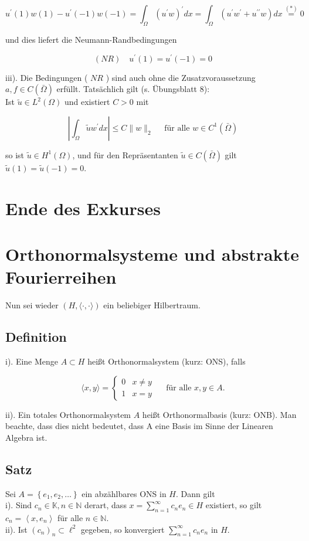 \documentclass[10pt, letterpaper]{article}
\begin{document}
$$
u^{\prime}(1) w(1)-u^{\prime}(-1) w(-1)=\int_{\Omega}\left(u^{\prime} w\right)^{\prime} d x=\int_{\Omega}\left(u^{\prime} w^{\prime}+u^{\prime \prime} w\right) d x \stackrel{(*)}{=} 0
$$

und dies liefert die Neumann-Randbedingungen

$$
(N R) \quad u^{\prime}(1)=u^{\prime}(-1)=0
$$

iii). Die Bedingungen ( $N R$ ) sind auch ohne die Zusatzvoraussetzung $a, f \in C(\bar{\Omega})$ erfüllt. Tatsächlich gilt (s. Übungsblatt 8):\\
Ist $\tilde{u} \in L^{2}(\Omega)$ und existiert $C>0$ mit

$$
\left|\int_{\Omega} \tilde{u} w^{\prime} d x\right| \leq C\|w\|_{2} \quad \text { für alle } w \in C^{1}(\bar{\Omega})
$$

so ist $\tilde{u} \in H^{1}(\Omega)$, und für den Repräsentanten $\tilde{u} \in C(\bar{\Omega})$ gilt $\tilde{u}(1)=\tilde{u}(-1)=0$.

\section*{Ende des Exkurses}
\section*{Orthonormalsysteme und abstrakte Fourierreihen}
Nun sei wieder $(H,\langle\cdot, \cdot\rangle)$ ein beliebiger Hilbertraum.

\subsection*{Definition}
i). Eine Menge $A \subset H$ heißt Orthonormalsystem (kurz: ONS), falls

$$
\langle x, y\rangle=\left\{\begin{array}{ll}
0 & x \neq y \\
1 & x=y
\end{array} \quad \text { für alle } x, y \in A .\right.
$$

ii). Ein totales Orthonormalsystem $A$ heißt Orthonormalbasis (kurz: ONB). Man beachte, dass dies nicht bedeutet, dass A eine Basis im Sinne der Linearen Algebra ist.

\subsection*{Satz}
Sei $A=\left\{e_{1}, e_{2}, \ldots\right\}$ ein abzählbares ONS in $H$. Dann gilt\\
i). Sind $c_{n} \in \mathbb{K}, n \in \mathbb{N}$ derart, dass $x=\sum_{n=1}^{\infty} c_{n} e_{n} \in H$ existiert, so gilt $c_{n}=\left\langle x, e_{n}\right\rangle$ für alle $n \in \mathbb{N}$.\\
ii). Ist $\left(c_{n}\right)_{n} \subset \ell^{2}$ gegeben, so konvergiert $\sum_{n=1}^{\infty} c_{n} e_{n}$ in $H$.
\end{document}
